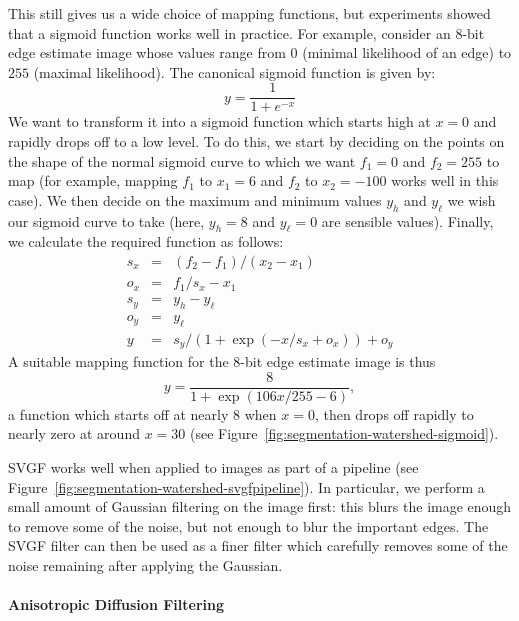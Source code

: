 This still gives us a wide choice of mapping functions, but experiments showed that a sigmoid function works well in practice. For example, consider an 8-bit edge estimate image whose values range from $0$ (minimal likelihood of an edge) to $255$ (maximal likelihood). The canonical sigmoid function is given by:
%
\[
y = \frac{1}{1 + e^{-x}}
\]
%
We want to transform it into a sigmoid function which starts high at $x = 0$ and rapidly drops off to a low level. To do this, we start by deciding on the points on the shape of the normal sigmoid curve to which we want $f_1 = 0$ and $f_2 = 255$ to map (for example, mapping $f_1$ to $x_1 = 6$ and $f_2$ to $x_2 = -100$ works well in this case). We then decide on the maximum and minimum values $y_h$ and $y_\ell$ we wish our sigmoid curve to take (here, $y_h = 8$ and $y_\ell = 0$ are sensible values). Finally, we calculate the required function as follows:
%
\begin{eqnarray*}
s_x & = & (f_2 - f_1)/(x_2 - x_1) \\
o_x & = & f_1/s_x - x_1 \\
s_y & = & y_h - y_\ell \\
o_y & = & y_\ell \\
y & = & s_y/(1 + \exp(-x/s_x + o_x)) + o_y
\end{eqnarray*}
%
A suitable mapping function for the 8-bit edge estimate image is thus
%
\[
y = \frac{8}{1 + \exp(106x/255 - 6)},
\]
%
a function which starts off at nearly $8$ when $x = 0$, then drops off rapidly to nearly zero at around $x = 30$ (see Figure~\ref{fig:segmentation-watershed-sigmoid}).


SVGF works well when applied to images as part of a pipeline (see Figure~\ref{fig:segmentation-watershed-svgfpipeline}). In particular, we perform a small amount of Gaussian filtering on the image first: this blurs the image enough to remove some of the noise, but not enough to blur the important edges. The SVGF filter can then be used as a finer filter which carefully removes some of the noise remaining after applying the Gaussian.


\paragraph{Anisotropic Diffusion Filtering}

